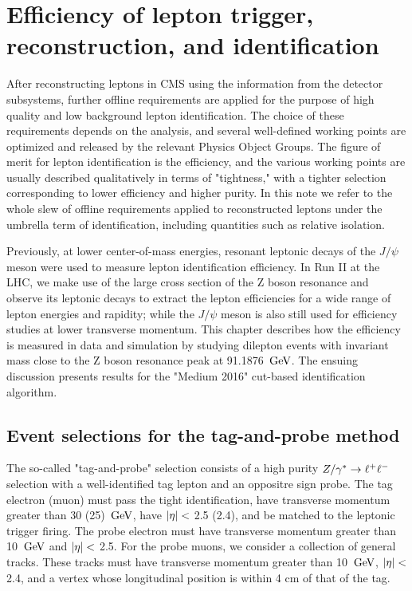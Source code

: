 \chapter{Efficiency of lepton trigger, reconstruction, and identification}
\label{chap:efficiency}
After reconstructing leptons in CMS using the information from the detector subsystems,
further offline requirements are applied for the purpose of high quality and low background lepton identification.
The choice of these requirements depends on the analysis, and several well-defined working points are optimized
and released by the relevant Physics Object Groups. The figure of merit for lepton identification is the efficiency,
and the various working points are usually described qualitatively in terms of "tightness,"
with a tighter selection corresponding to lower efficiency and higher purity.
In this note we refer to the whole slew of offline requirements applied to reconstructed leptons under the umbrella term of identification, including quantities such as relative isolation.

Previously, at lower center-of-mass energies, resonant leptonic decays of the $J/\psi$ meson were used to measure lepton identification efficiency.
In Run II at the LHC, we make use of the large cross section of the Z boson resonance and observe its leptonic decays to extract the lepton efficiencies for a wide range of lepton energies and rapidity;
while the $J/\psi$ meson is also still used for efficiency studies at lower transverse momentum.
This chapter describes how the efficiency is measured in data and simulation by studying dilepton events with invariant mass close to the Z boson resonance peak at 91.1876 $\,\text{Ge\hspace{-.08em}V}$.
The ensuing discussion presents results for the "Medium 2016" cut-based identification algorithm.

\section{Event selections for the tag-and-probe method}
\label{sec:tnpsel}
The so-called "tag-and-probe" selection consists of a high purity $Z/\gamma^*\to\ell^+\ell^-$ selection with a
well-identified tag lepton and an oppositre sign probe.
The tag electron (muon) must pass the tight identification, have transverse momentum greater than 30 (25) $\,\text{Ge\hspace{-.08em}V}$, 
have $\lvert \eta \rvert<$ 2.5 (2.4), and be matched to the leptonic trigger firing.
The probe electron must have transverse momentum greater than 10 $\,\text{Ge\hspace{-.08em}V}$ and $\lvert \eta \rvert<$ 2.5.
For the probe muons, we consider a collection of general tracks. These tracks must have transverse momentum 
greater than 10 $\,\text{Ge\hspace{-.08em}V}$, $\lvert \eta \rvert<$ 2.4, and a vertex whose longitudinal position is within 4 cm of that of the tag.

